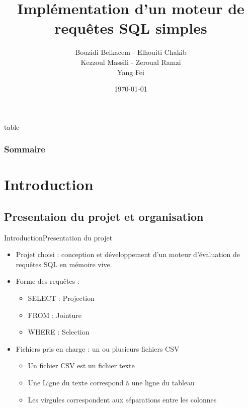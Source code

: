 \documentclass[10pt,handout]{beamer}
\title[Moteur de requêtes SQL]{Implémentation d’un moteur de \\ requêtes SQL simples}
\author[Bouzidi, Elhouiti, Kezzoul, Zeroual, Yang]{Bouzidi Belkacem - Elhouiti Chakib \\ Kezzoul Massili - Zeroual Ramzi \\ Yang Fei}
\institute[]{Université de Montpellier}
\date{\today}
\newif\ifplacelogo %
\begin{document}
\placelogofalse
\begin{frame}
	\titlepage
\end{frame}

\placelogotrue


\begin{frame}{table}
	\frametitle{Sommaire}
	\tableofcontents
\end{frame}

\section{Introduction}

\subsection{Presentaion du projet et organisation}

\begin{frame}{Introduction}{Presentation du projet}
\begin{itemize}
  \item Projet choisi : conception et développement d’un moteur d’évaluation de requêtes SQL en mémoire vive.
  \item Forme des requêtes :
  \begin{itemize}
    \item SELECT : Projection
    \item FROM : Jointure
    \item WHERE : Selection
  \end{itemize}
  \item Fichiers pris en charge : un ou plusieurs fichiers CSV
  \begin{itemize}
    \item Un fichier CSV est un fichier texte
    \item Une Ligne du texte correspond à une ligne du tableau
    \item Les virgules correspondent aux séparations entre les colonnes
  \end{itemize}
\end{itemize}
\end{frame}
\end{document}
